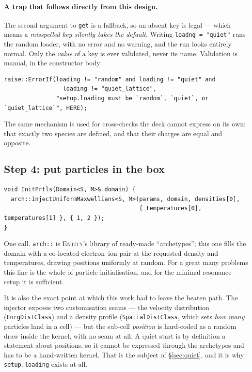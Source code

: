 \documentclass[11pt,a4paper]{article}
\newcommand{\code}[1]{\texttt{\small #1}}
\begin{document}
\paragraph{A trap that follows directly from this design.} The second argument to
\code{get} is a fallback, so an absent key is legal --- which means a \emph{misspelled
key silently takes the default}. Writing \code{loadng = "quiet"} runs the random
loader, with no error and no warning, and the run looks entirely normal. Only the
\emph{value} of a key is ever validated, never its name. Validation is manual, in the
constructor body:

\begin{lstlisting}
raise::ErrorIf(loading != "random" and loading != "quiet" and
                 loading != "quiet_lattice",
               "setup.loading must be `random`, `quiet`, or `quiet_lattice`", HERE);
\end{lstlisting}

The same mechanism is used for cross-checks the deck cannot express on its own: that
exactly two species are defined, and that their charges are equal and opposite.

\subsection{Step 4: put particles in the box}

\begin{lstlisting}
void InitPrtls(Domain<S, M>& domain) {
  arch::InjectUniformMaxwellians<S, M>(params, domain, densities[0],
                                       { temperatures[0], temperatures[1] }, { 1, 2 });
}
\end{lstlisting}

One call. \code{arch::} is \textsc{Entity}'s library of ready-made ``archetypes'';
this one fills the domain with a co-located electron--ion pair at the requested
density and temperatures, drawing positions uniformly at random. For a great many
problems this line is the whole of particle initialisation, and for the minimal
resonance setup it is sufficient.

It is also the exact point at which this work had to leave the beaten path. The
injector exposes two customisation seams --- the velocity distribution
(\code{EnrgDistClass}) and a density profile (\code{SpatialDistClass}, which sets
\emph{how many} particles land in a cell) --- but the sub-cell \emph{position} is
hard-coded as a random draw inside the kernel, with no seam at all. A quiet start is
by definition a statement about positions, so it cannot be expressed through the
archetypes and has to be a hand-written kernel. That is the subject of
\S\ref{sec:quiet}, and it is why \code{setup.loading} exists at all.
\end{document}
